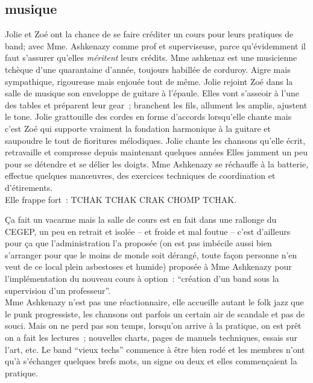 \documentclass{article}
\begin{document}
\clearpage

\subsection{musique}

Jolie et Zoé ont la chance de se faire créditer un cours pour leurs pratiques
de band; avec Mme. Ashkenazy comme prof et superviseuse, parce qu'évidemment
il faut s'assurer qu'elles \textit{méritent} leurs crédits.
Mme ashkenaz est une musicienne tchèque d’une
quarantaine d’année, toujours habillée de corduroy. Aigre mais sympathique,
rigoureuse mais enjouée tout de même. Jolie rejoint Zoé dans la salle de
musique son enveloppe de guitare à l’épaule. Elles vont s’asseoir à l’une des
tables et préparent leur gear ; branchent les fils, allument les amplis,
ajustent le tone. Jolie grattouille des cordes en forme d’accords lorsqu’elle
chante mais c’est Zoé qui supporte vraiment la fondation harmonique à la
guitare et saupoudre le tout de fioritures mélodiques. Jolie chante les
chansons qu’elle écrit, retravaille et compresse depuis maintenant quelques
années Elles jamment un peu pour se détendre et se délier les doigts. Mme
Ashkenazy se réchauffe à la batterie, effectue quelques manœuvres, des exercices
techniques de coordination et d’étirements.\\

Elle frappe fort : TCHAK TCHAK CRAK CHOMP TCHAK.

Ça fait un vacarme mais la salle de cours est en fait dans une rallonge du
CEGEP, un peu en retrait et isolée – et froide et mal foutue – c’est d’ailleurs
pour ça que l’administration l’a proposée (on est pas imbécile aussi bien
s’arranger pour que le moins de monde soit dérangé, toute façon personne n’en
veut de ce local plein asbestoses et humide) proposée à Mme Ashkenazy pour
l’implémentation du nouveau cours à option : “création d’un band sous la
supervision d’un professeur”.\\

Mme Ashkenazy n’est pas une réactionnaire, elle accueille autant le folk jazz
que le punk progressiste, les chansons ont parfois un certain air de scandale
et pas de souci. Mais on ne perd pas son temps, lorsqu’on arrive à la pratique,
on est prêt on a fait les lectures ; nouvelles charts, pages de manuels
techniques, essais sur l’art, etc. Le band “vieux techs” commence à être bien
rodé et les membres n’ont qu’à s’échanger quelques brefs mots, un signe ou deux
et elles commençaient la pratique. \\
\end{document}
